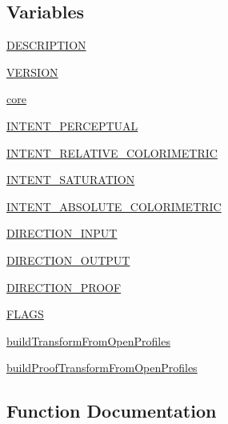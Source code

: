 \subsection*{Variables}
\begin{DoxyCompactItemize}
\item 
\hyperlink{namespacePIL_1_1ImageCms_a1cb6f4ece31aeb26e7300cb223a20c08}{D\+E\+S\+C\+R\+I\+P\+T\+I\+ON}
\item 
\hyperlink{namespacePIL_1_1ImageCms_a4d747c6c3e96158bb7d7b74d39d4974a}{V\+E\+R\+S\+I\+ON}
\item 
\hyperlink{namespacePIL_1_1ImageCms_a735f75094ba6691293df221f9ac2e053}{core}
\item 
\hyperlink{namespacePIL_1_1ImageCms_a5ede11c95f67c7ea71b86e9a9e8a4f87}{I\+N\+T\+E\+N\+T\+\_\+\+P\+E\+R\+C\+E\+P\+T\+U\+AL}
\item 
\hyperlink{namespacePIL_1_1ImageCms_ac305a864052f71bfd731192f8cf2ac72}{I\+N\+T\+E\+N\+T\+\_\+\+R\+E\+L\+A\+T\+I\+V\+E\+\_\+\+C\+O\+L\+O\+R\+I\+M\+E\+T\+R\+IC}
\item 
\hyperlink{namespacePIL_1_1ImageCms_aafd60fb7cb9a6b52ade4a0476648f966}{I\+N\+T\+E\+N\+T\+\_\+\+S\+A\+T\+U\+R\+A\+T\+I\+ON}
\item 
\hyperlink{namespacePIL_1_1ImageCms_a6704a2c2d4e948b9d74a12a567f68b9e}{I\+N\+T\+E\+N\+T\+\_\+\+A\+B\+S\+O\+L\+U\+T\+E\+\_\+\+C\+O\+L\+O\+R\+I\+M\+E\+T\+R\+IC}
\item 
\hyperlink{namespacePIL_1_1ImageCms_a88c7a6117a9a5637bdd1eb50b1185bb8}{D\+I\+R\+E\+C\+T\+I\+O\+N\+\_\+\+I\+N\+P\+UT}
\item 
\hyperlink{namespacePIL_1_1ImageCms_aad4458286c0679a78f4f4924e117d3d0}{D\+I\+R\+E\+C\+T\+I\+O\+N\+\_\+\+O\+U\+T\+P\+UT}
\item 
\hyperlink{namespacePIL_1_1ImageCms_a54fbf4bac14edf38a80bbafd455e4d3c}{D\+I\+R\+E\+C\+T\+I\+O\+N\+\_\+\+P\+R\+O\+OF}
\item 
\hyperlink{namespacePIL_1_1ImageCms_a5d515bb9c146f7443320c31c56f35a8f}{F\+L\+A\+GS}
\item 
\hyperlink{namespacePIL_1_1ImageCms_a881480a9da1f433b1bc1b32646ceeccf}{build\+Transform\+From\+Open\+Profiles}
\item 
\hyperlink{namespacePIL_1_1ImageCms_a46a8d865da2ddec9fbb2286deb7d0cec}{build\+Proof\+Transform\+From\+Open\+Profiles}
\end{DoxyCompactItemize}


\subsection{Function Documentation}
\mbox{\label{namespacePIL_1_1ImageCms_adff11388c09e5e0feecc550a8ffda483}} 
